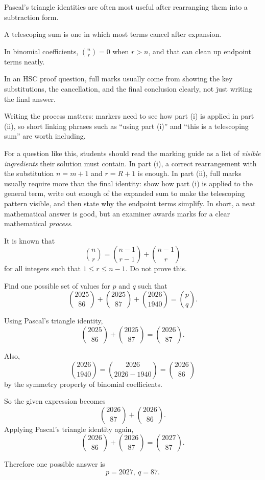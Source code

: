 \begin{takeaways}
\item Pascal's triangle identities are often most useful after rearranging them into a subtraction form.
\item A telescoping sum is one in which most terms cancel after expansion.
\item In binomial coefficients, $\binom{n}{r}=0$ when $r>n$, and that can clean up endpoint terms neatly.
\item In an HSC proof question, full marks usually come from showing the key substitutions, the cancellation, and the final conclusion clearly, not just writing the final answer.
\item Writing the process matters: markers need to see how part (i) is applied in part (ii), so short linking phrases such as ``using part (i)'' and ``this is a telescoping sum'' are worth including.
\end{takeaways}

\begin{remark}
For a question like this, students should read the marking guide as a list of \emph{visible ingredients} their solution must contain. In part (i), a correct rearrangement with the substitution $n=m+1$ and $r=R+1$ is enough. In part (ii), full marks usually require more than the final identity: show how part (i) is applied to the general term, write out enough of the expanded sum to make the telescoping pattern visible, and then state why the endpoint terms simplify. In short, a neat mathematical answer is good, but an examiner awards marks for a clear mathematical \emph{process}.
\end{remark}

\begin{problem}
It is known that
\[
\binom{n}{r}=\binom{n-1}{r-1}+\binom{n-1}{r}
\]
for all integers such that $1\le r\le n-1$. Do not prove this.

Find one possible set of values for $p$ and $q$ such that
\[
\binom{2025}{86}+\binom{2025}{87}+\binom{2026}{1940}=\binom{p}{q}.
\]
\end{problem}

\begin{solution}
Using Pascal's triangle identity,
\[
\binom{2025}{86}+\binom{2025}{87}=\binom{2026}{87}.
\]

Also,
\[
\binom{2026}{1940}=\binom{2026}{2026-1940}=\binom{2026}{86}
\]
by the symmetry property of binomial coefficients.

So the given expression becomes
\[
\binom{2026}{87}+\binom{2026}{86}.
\]
Applying Pascal's triangle identity again,
\[
\binom{2026}{86}+\binom{2026}{87}=\binom{2027}{87}.
\]

Therefore one possible answer is
\[
\boxed{p=2027,\ q=87}.
\]
\end{solution}

